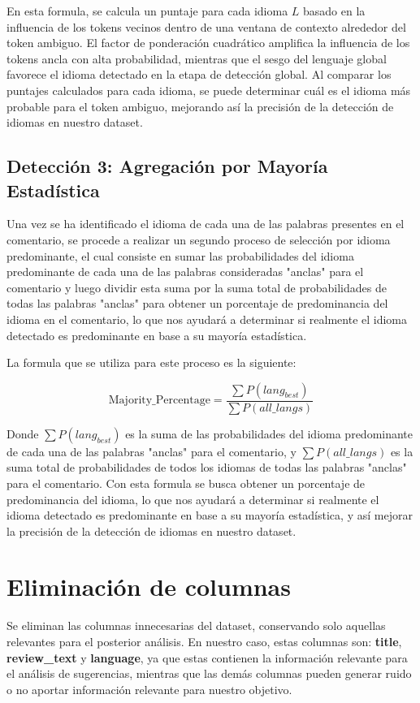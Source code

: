 En esta formula, se calcula un puntaje para cada idioma $L$ basado en la influencia de los tokens vecinos dentro de una ventana de contexto alrededor del token ambiguo. El factor de ponderación cuadrático amplifica la influencia de los tokens ancla con alta probabilidad, mientras que el sesgo del lenguaje global favorece el idioma detectado en la etapa de detección global. Al comparar los puntajes calculados para cada idioma, se puede determinar cuál es el idioma más probable para el token ambiguo, mejorando así la precisión de la detección de idiomas en nuestro dataset.

\subsection{\textbf{Detección 3: Agregación por Mayoría Estadística}}
\label{cha:Aggregation by Statistical Majority}

Una vez se ha identificado el idioma de cada una de las palabras presentes en el comentario, se procede a realizar un segundo proceso de selección por idioma predominante, el cual consiste en sumar las probabilidades del idioma predominante de cada una de las palabras consideradas "anclas" para el comentario y luego dividir esta suma por la suma total de probabilidades de todas las palabras "anclas" para obtener un porcentaje de predominancia del idioma en el comentario, lo que nos ayudará a determinar si realmente el idioma detectado es predominante en base a su mayoría estadística.

La formula que se utiliza para este proceso es la siguiente:

\begin{equation}
\displaystyle \text{Majority\_Percentage} = \frac{\sum P(lang_{best})}{\sum P(all\_langs)}
\end{equation}

Donde $\sum P(lang_{best})$ es la suma de las probabilidades del idioma predominante de cada una de las palabras "anclas" para el comentario, y $\sum P(all\_langs)$ es la suma total de probabilidades de todos los idiomas de todas las palabras "anclas" para el comentario. Con esta formula se busca obtener un porcentaje de predominancia del idioma, lo que nos ayudará a determinar si realmente el idioma detectado es predominante en base a su mayoría estadística, y así mejorar la precisión de la detección de idiomas en nuestro dataset.

\section{\textbf{Eliminación de columnas}}
Se eliminan las columnas innecesarias del dataset, conservando solo aquellas relevantes para el posterior análisis. En nuestro caso, estas columnas son: \textbf{title}, \textbf{review\_text} y \textbf{language}, ya que estas contienen la información relevante para el análisis de sugerencias, mientras que las demás columnas pueden generar ruido o no aportar información relevante para nuestro objetivo.

